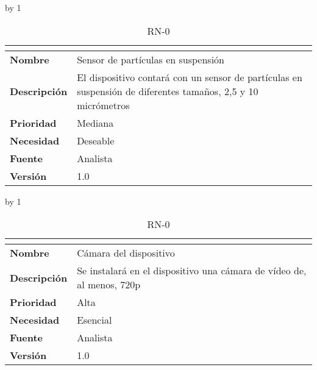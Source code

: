 \advance\rn by 1
\begin{table}[H]
	\caption{RN-0\number\rn}
	\begin{tabular}{|l|p{}|}
		\hline
		\multicolumn{2}{|c|}{\cellcolor[HTML]{BFBFBF}{\color[HTML]{000000} \textbf{RN-0\number\rn}}} \\ \hline
		\textbf{Nombre}      & Sensor de partículas en suspensión                                                                           \\ \hline
		\textbf{Descripción} & El dispositivo contará con un sensor de partículas en suspensión de diferentes tamaños, 2,5 y 10 micrómetros \\ \hline
		\textbf{Prioridad}   & Mediana                                                                                                      \\ \hline
		\textbf{Necesidad}   & Deseable                                                                                                     \\ \hline
		\textbf{Fuente}      & Analista                                                                                                     \\ \hline
		\textbf{Versión}     & 1.0                                                                                                          \\ \hline
	\end{tabular}
\end{table}
\advance\rn by 1
\begin{table}[H]
	\caption{RN-0\number\rn}
	\begin{tabular}{|l|p{}|}
		\hline
		\multicolumn{2}{|c|}{\cellcolor[HTML]{BFBFBF}{\color[HTML]{000000} \textbf{RN-0\number\rn}}} \\ \hline
		\textbf{Nombre}      & Cámara del dispositivo                                                \\ \hline
		\textbf{Descripción} & Se instalará en el dispositivo una cámara de vídeo de, al menos, 720p \\ \hline
		\textbf{Prioridad}   & Alta                                                                  \\ \hline
		\textbf{Necesidad}   & Esencial                                                              \\ \hline
		\textbf{Fuente}      & Analista                                                              \\ \hline
		\textbf{Versión}     & 1.0                                                                   \\ \hline
	\end{tabular}
\end{table}
